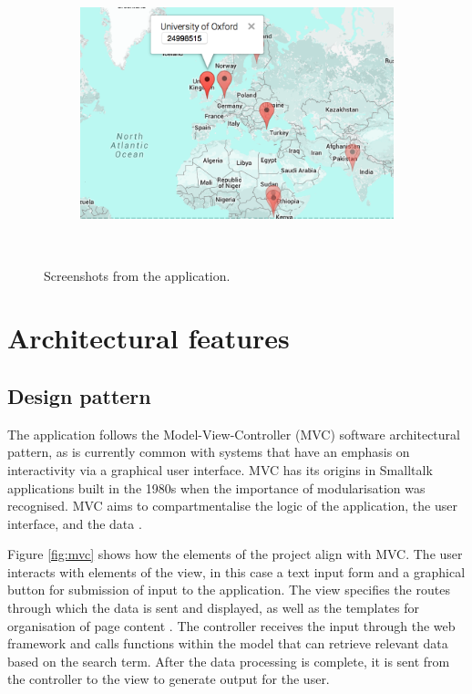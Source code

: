 \documentclass[Report.tex]{subfiles}
\begin{document}
\begin{figure}[!]
\begin{subfigure}{0.45\textwidth}
	\end{subfigure}%
	\hfill
	\begin{subfigure}{0.45\textwidth}
		\includegraphics[width=\textwidth]{../lib/images/screen4}
	\end{subfigure}\\
\caption{Screenshots from the application.}
\label{fig:screen1}
\end{figure}
\hfill

\section{Architectural features}
\subsection{Design pattern}
The application follows the Model-View-Controller (MVC) software architectural pattern, as is currently common with systems that have an emphasis on interactivity via a graphical user interface. MVC has its origins in Smalltalk applications built in the 1980s when the importance of modularisation was recognised. MVC aims to compartmentalise the logic of the application, the user interface, and the data \cite{mozilla_mvc}.\newline 

\noindent Figure \ref{fig:mvc} shows how the elements of the project align with MVC. The user interacts with elements of the view, in this case a text input form and a graphical button for submission of input to the application. The view specifies the routes through which the data is sent and displayed, as well as the templates for organisation of page content \cite{mozilla_mvc}. The controller receives the input through the web framework and calls functions within the model that can retrieve relevant data based on the search term. After the data processing is complete, it is sent from the controller to the view to generate output for the user. \newline
\end{document}
